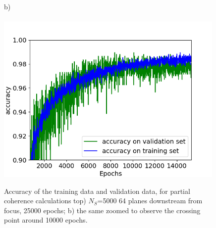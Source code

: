 \documentclass{iucr}
\begin{document}
\begin{figure}
    b)~~~~~~~~~~~~~~~~~~~~~~~~~~~~~~~~~~~~~~~~~~~~~~~~~~~~~~~~~~~~~~~~~~~~~~~~~~~~~~~\\
    \includegraphics[width=0.99\textwidth]{figures/v23zoom.png}
    \caption{Accuracy of the training data and validation data, for partial coherence calculations top) $N_S$=5000 64 planes downstream from focus, 25000 epochs;
    b) the same zoomed to observe the crossing point around 10000 epochs.
    }
\end{figure}
\end{document}
